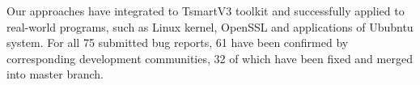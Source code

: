 \begin{eabstract}
	Our approaches have integrated to TsmartV3 toolkit and successfully applied to real-world programs, such as Linux kernel, OpenSSL and applications of Ububntu system.
	For all 75 submitted bug reports, 61 have been confirmed by corresponding development communities, 32 of which have been fixed and merged into master branch.
	
\end{eabstract}

